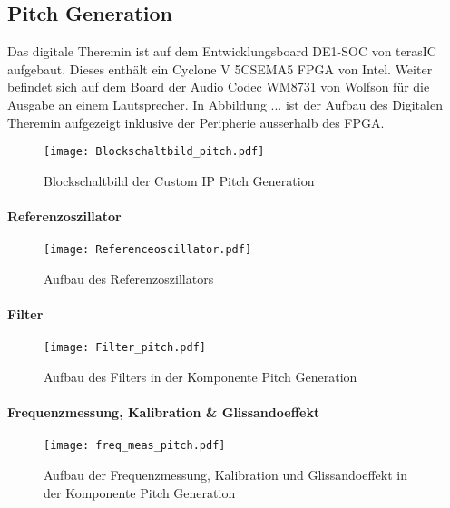 \subsection{Pitch Generation}\label{subsec:Pitch_Generation}

Das digitale Theremin ist auf dem Entwicklungsboard DE1-SOC von terasIC aufgebaut. Dieses enthält ein Cyclone V 5CSEMA5 FPGA von Intel. Weiter befindet sich auf dem Board der Audio Codec WM8731 von Wolfson für die Ausgabe an einem Lautsprecher. In Abbildung ...  ist der Aufbau des Digitalen Theremin aufgezeigt inklusive der Peripherie ausserhalb des FPGA.


\begin{figure}[h!]
	\centering
	\texttt{[image: Blockschaltbild\_pitch.pdf]}
	\caption{Blockschaltbild der Custom IP Pitch Generation} 
	\label{img:Blockschaltbild_pitch}
\end{figure}  



\paragraph{Referenzoszillator}

\begin{figure}[h!]
	\centering
	\texttt{[image: Referenceoscillator.pdf]}
	\caption{Aufbau des Referenzoszillators} 
	\label{img:Referenceoscillator}
\end{figure}  

\paragraph{Filter}

\begin{figure}[h!]
	\centering
	\texttt{[image: Filter\_pitch.pdf]}
	\caption{Aufbau des Filters in der Komponente Pitch Generation} 
	\label{img:Filter_Pitch}
\end{figure}  

\paragraph{Frequenzmessung, Kalibration \& Glissandoeffekt}

\begin{figure}[h!]
	\centering
	\texttt{[image: freq\_meas\_pitch.pdf]}
	\caption{Aufbau der Frequenzmessung, Kalibration und Glissandoeffekt in der Komponente Pitch Generation} 
	\label{img:freq_meas_pitch}
\end{figure}  